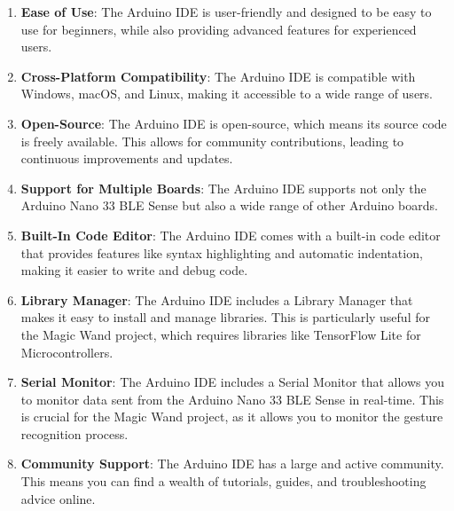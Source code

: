 \begin{enumerate}
    \item \textbf{Ease of Use}: The Arduino IDE is user-friendly and designed to be easy to use for beginners, while also providing advanced features for experienced users.
    
    \item \textbf{Cross-Platform Compatibility}: The Arduino IDE is compatible with Windows, macOS, and Linux, making it accessible to a wide range of users.
    
    \item \textbf{Open-Source}: The Arduino IDE is open-source, which means its source code is freely available. This allows for community contributions, leading to continuous improvements and updates.
    
    \item \textbf{Support for Multiple Boards}: The Arduino IDE supports not only the Arduino Nano 33 BLE Sense but also a wide range of other Arduino boards.
    
    \item \textbf{Built-In Code Editor}: The Arduino IDE comes with a built-in code editor that provides features like syntax highlighting and automatic indentation, making it easier to write and debug code.
    
    \item \textbf{Library Manager}: The Arduino IDE includes a Library Manager that makes it easy to install and manage libraries. This is particularly useful for the Magic Wand project, which requires libraries like TensorFlow Lite for Microcontrollers.
    
    \item \textbf{Serial Monitor}: The Arduino IDE includes a Serial Monitor that allows you to monitor data sent from the Arduino Nano 33 BLE Sense in real-time. This is crucial for the Magic Wand project, as it allows you to monitor the gesture recognition process.
    
    \item \textbf{Community Support}: The Arduino IDE has a large and active community. This means you can find a wealth of tutorials, guides, and troubleshooting advice online.
\end{enumerate}


